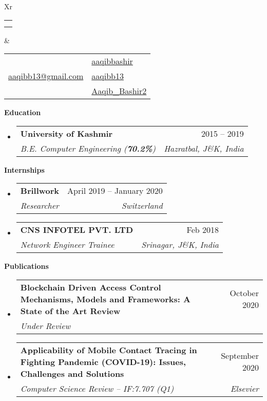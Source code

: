 \documentclass[letterpaper,12pt]{article}[leftmargin=*]
\makeatletter
\def \fullname {Aaqib Bashir}
\def \subtitle {}
\def \linkedinicon {\faLinkedin}
\def \linkedinlink {https://www.linkedin.com/in/aaqibbashir/}
\def \linkedintext {aaqibbashir}
\def \phoneicon {\faPhone}
\def \phonetext {+91 000 111 22 33}
\def \emailicon {\faEnvelope}
\def \emaillink {mailto: aaqibb13@gmail.com}
\def \emailtext {aaqibb13@gmail.com}
\def \githubicon {\faGithub}
\def \githublink {https://github.com/aaqibb13}
\def \githubtext {aaqibb13}
\def \websiteicon {\faGlobe}
\def \websitelink {https://researchgate.net/profile/Aaqib_Bashir2}
\def \websitetext {Aaqib\_Bashir2}
\def \headertype {\doublecol} %
\def \entryspacing {-0pt}
\def \linkedin {\linkedinicon \hspace{3pt}\href{\linkedinlink}{\linkedintext}}
\def \phone {\phoneicon \hspace{3pt}{ \phonetext}}
\def \email {\emailicon \hspace{3pt}\href{\emaillink}{\emailtext}}
\def \github {\githubicon \hspace{3pt}\href{\githublink}{\githubtext}}
\def \website {\websiteicon \hspace{3pt}\href{\websitelink}{\websitetext}}
\renewcommand{\section}[2]{\vspace{5pt}
  \colorbox{ternary}{\color{white}\raggedbottom\normalsize\textbf{{#1}{\hspace{7pt}#2}}}
}
\newcommand{\resumeEntryStart}{\begin{itemize}[leftmargin=2.5mm]}
\newcommand{\resumeEntryEnd}{\end{itemize}\vspace{\entryspacing}}
\newcommand{\resumeEntryTSDL}[4]{
  \vspace{-1pt}\item[]
    \begin{tabularx}{0.97\textwidth}{X@{\hspace{60pt}}r}
      \textbf{\color{primary}#1} & {\firabook\color{accent}\small#2} \\
      \textit{\color{accent}\small#3} & \textit{\color{accent}\small#4} \\
    \end{tabularx}\vspace{-6pt}
}
\newcommand{\doublecol}[6]{
  \begin{tabularx}{\textwidth}{Xr}
    {
      \begin{tabular}[c]{l}
        \fontsize{35}{45}\selectfont{\color{primary}{{\textbf{\fullname}}}} \\
        {\textit{\subtitle}} %
      \end{tabular}
    } & {
      \begin{tabular}[c]{l@{\hspace{1.5em}}l}
        {\small#4} & {\small#1} \\
        {\small#5} & {\small#2} \\
        {\small#6} & {\small#3}
      \end{tabular}
    }
  \end{tabularx}
}
\newcommand{\singlecol}[6]{
  \begin{tabularx}{\textwidth}{Xr}
    {
      \begin{tabular}[b]{l}
        \fontsize{35}{45}\selectfont{\color{primary}{{\textbf{\fullname}}}} \\
        {\textit{\subtitle}} %
      \end{tabular}
    } & {
      \begin{tabular}[c]{l}
        {\small#1} \\
        {\small#2} \\
        {\small#3} \\
        {\small#4} \\
        {\small#5} \\
        {\small#6}
      \end{tabular}
    }
  \end{tabularx}
}
\makeatother
\begin{document}


\headertype{\linkedin}{\github}{\website}{\phone}{\email}{} %
\vspace{-10pt} %

\section{\faGraduationCap}{Education}

  \resumeEntryStart
    \resumeEntryTSDL
      {University of Kashmir}{2015 -- 2019}
      {B.E. Computer Engineering (\textbf{70.2\%})}{Hazratbal, J\&K, India}
  \resumeEntryEnd

\section{\faGraduationCap}{Internships}

  \resumeEntryStart
    \resumeEntryTSDL
      {Brillwork}{April 2019 -- January 2020}
      {Researcher}{Switzerland}
    \resumeEntryTSDL
      {CNS INFOTEL PVT. LTD}{Feb 2018}
      {Network Engineer Trainee}{Srinagar, J\&K, India}
  \resumeEntryEnd

\section{\faPencilSquare}{Publications}
 \resumeEntryStart
    \resumeEntryTSDL
      {Blockchain Driven Access Control Mechanisms, Models and Frameworks: A State of the Art Review}{October 2020}
      {Under Review}{}
  \resumeEntryEnd



 \resumeEntryStart
    \resumeEntryTSDL
      {Applicability of Mobile Contact Tracing in Fighting Pandemic (COVID-19): Issues, Challenges and Solutions}{September 2020}
      {Computer Science Review -- IF:7.707 (Q1)}{Elsevier}
  \resumeEntryEnd 
  
\end{document}
